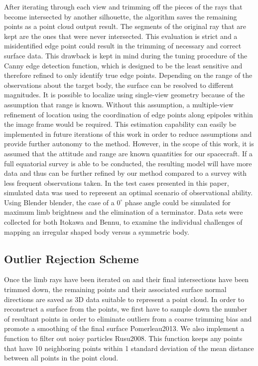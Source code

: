 \indent After iterating through each view and trimming off the pieces of the rays that become intersected by another silhouette, the algorithm saves the remaining points as a point cloud output result. The segments of the original ray that are kept are the ones that were never intersected. This evaluation is strict and a misidentified edge point could result in the trimming of necessary and correct surface data. This drawback is kept in mind during the tuning procedure of the Canny edge detection function, which is designed to be the least sensitive and therefore refined to only identify true edge points. Depending on the range of the observations about the target body, the surface can be resolved to different magnitudes. It is possible to localize using single-view geometry because of the assumption that range is known. Without this assumption, a multiple-view refinement of location using the coordination of edge points along epipoles within the image frame would be required. This estimation capability can easily be implemented in future iterations of this work in order to reduce assumptions and provide further autonomy to the method. However, in the scope of this work, it is assumed that the attitude and range are known quantities for our spacecraft. If a full equatorial survey is able to be conducted, the resulting model will have more data and thus can be further refined by our method compared to a survey with less frequent observations taken. In the test cases presented in this paper, simulated data was used to represent an optimal scenario of observational ability. Using Blender {blender}, the case of a $0^\circ$ phase angle could be simulated for maximum limb brightness and the elimination of a terminator. Data sets were collected for both Itokawa and Bennu, to examine the individual challenges of mapping an irregular shaped body versus a symmetric body. 

\subsection{Outlier Rejection Scheme}
Once the limb rays have been iterated on and their final intersections have been trimmed down, the remaining points and their associated surface normal directions are saved as 3D data suitable to represent a point cloud. In order to reconstruct a surface from the points, we first have to sample down the number of resultant points in order to eliminate outliers from a coarse trimming bias and promote a smoothing of the final surface {Pomerleau2013}. We also implement a function to filter out noisy particles {Rusu2008}. This function keeps any points that have 10 neighboring points within 1 standard deviation of the mean distance between all points in the point cloud.

